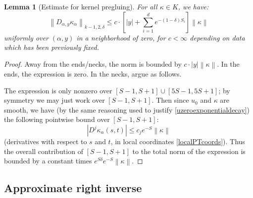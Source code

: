 \documentclass[12pt]{article}
\newtheorem{lemma}[theorem]{Lemma}
\theoremstyle{definition}
\theoremstyle{remark}
\numberwithin{equation}{subsection}
\begin{document}
\begin{lemma}[Estimate for kernel pregluing]\label{pregluingKestimate}
For all $\kappa\in K$, we have:
\begin{equation}
\left\|D_{\alpha,y}\kappa_\alpha\right\|_{k-1,2,\delta}\leq c\cdot\left[\left|y\right|+\sum_{i=1}^de^{-(1-\delta)S_i}\right]\left\|\kappa\right\|
\end{equation}
uniformly over $(\alpha,y)$ in a neighborhood of zero, for $c<\infty$ depending on data which has been previously fixed.
\end{lemma}

\begin{proof}
Away from the ends/necks, the norm is bounded by $c\cdot\left|y\right|\left\|\kappa\right\|$.  In the ends, the expression is zero.  In the necks, argue as follows.

The expression is only nonzero over $[S-1,S+1]\cup[5S-1,5S+1]$; by symmetry we may just work over $[S-1,S+1]$.  Then since $u_0$ and $\kappa$ are smooth, we have (by the same reasoning used to justify \eqref{uzeroexponentialdecay}) the following pointwise bound over $[S-1,S+1]$:
\begin{equation}
\left|D^j\kappa_\alpha(s,t)\right|\leq c_je^{-S}\left\|\kappa\right\|
\end{equation}
(derivatives with respect to $s$ and $t$, in local coordinates \eqref{localPTcoords}).  Thus the overall contribution of $[S-1,S+1]$ to the total norm of the expression is bounded by a constant times $e^{S\delta}e^{-S}\left\|\kappa\right\|$.
\end{proof}

\subsection{Approximate right inverse}
\end{document}
